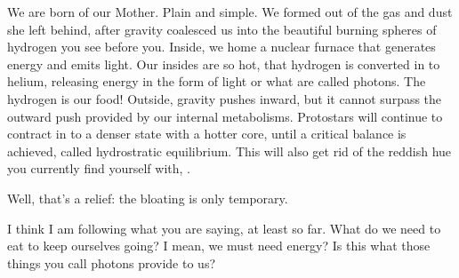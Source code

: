 \documentclass[main.tex]{subfiles}
\begin{document}
\par \Maia We are born of our Mother.  Plain and simple.  We formed out of the gas and dust she left behind, after gravity coalesced us into the beautiful burning spheres of hydrogen you see before you.  Inside, we home a nuclear furnace that generates energy and emits light.  Our insides are so hot, that hydrogen is converted in to helium, releasing energy in the form of light or what are called photons.  The hydrogen is our food!  Outside, gravity pushes inward, but it cannot surpass the outward push provided by our internal metabolisms.  Protostars will continue to contract in to a denser state with a hotter core, until a critical balance is achieved, called hydrostratic equilibrium.  This will also get rid of the reddish hue you currently find yourself with, \rmsterope.


\par \Sterope Well, that's a relief: the bloating is only temporary.

\par \Alcyone I think I am following what you are saying, at least so far.  What do we need to eat to keep ourselves going?  I mean, we must need energy?  Is this what those things you call photons provide to us?
\end{document}
